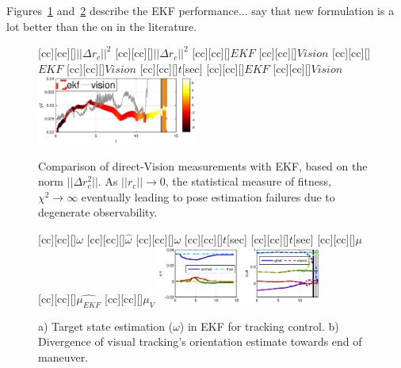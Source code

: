 Figures~\ref{fig:fig_norm_errors} and~\ref{fig:states_EKF} describe the EKF performance... say that new formulation is a lot better than the on in the literature.
%
\begin{figure}[t!]
[cc][cc][\FontFigB]{$||\Delta r_c||^2$}
[cc][cc][\FontFigB]{$||\Delta r_c||^2$}
[cc][cc][\FontFigS]{$EKF$}
[cc][cc][\FontFigS]{$Vision$}
[cc][cc][\FontFigS]{$EKF$}
[cc][cc][\FontFigS]{$Vision$}
[cc][cc][\FontFigB]{$t$[sec]}
[cc][cc][\FontFigS]{$EKF$}
[cc][cc][\FontFigS]{$Vision$}
\centering\includegraphics[angle=0,width=0.47\textwidth]{./figures/fig_norm_errors}
\caption{Comparison of direct-Vision measurements with EKF, based on the norm $||\Delta r_c^2||$. As $||r_c|| \rightarrow 0$, the statistical measure of fitness, $\chi^2 \rightarrow \infty $ eventually leading to pose estimation failures due to degenerate observability.}
\label{fig:fig_norm_errors}
\end{figure}
%
%
\begin{figure}[t!]
[cc][cc][\FontFigB]{$\omega$}
[cc][cc][\FontFigB]{$\hat{\omega}$}
[cc][cc][\FontFigB]{$\omega$}
[cc][cc][\FontFigB]{$t$[sec]}
[cc][cc][\FontFigB]{$t$[sec]}
[cc][cc][\FontFigB]{$\mu$}
[cc][cc][\FontFigB]{$\hat{\mu_{EKF}}$}
[cc][cc][\FontFigB]{$\mu_V$}
\centering\includegraphics[angle=0,width=0.48\textwidth]{./figures/states_EKF}
\caption{a) Target state estimation ($\omega$) in EKF for tracking control. b) Divergence of visual tracking's orientation estimate towards end of maneuver.}
\label{fig:states_EKF}
\end{figure}
%
